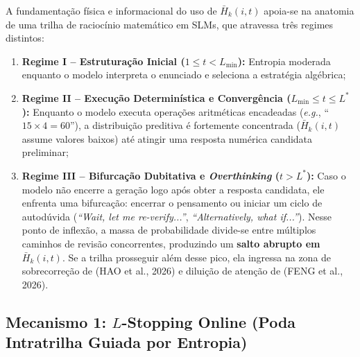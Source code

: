\documentclass[9pt,conference]{IEEEtran}
\begin{document}
A fundamenta\c{c}\~{a}o f\'{i}sica e informacional do uso de $\bar{H}_k(i, t)$ apoia-se na anatomia de uma trilha de racioc\'{i}nio matem\'{a}tico em SLMs, que atravessa tr\^{e}s regimes distintos:
\begin{enumerate}
    \item \textbf{Regime I -- Estrutura\c{c}\~{a}o Inicial ($1 \le t < L_{\min}$):} Entropia moderada enquanto o modelo interpreta o enunciado e seleciona a estrat\'{e}gia alg\'{e}brica;
    \item \textbf{Regime II -- Execu\c{c}\~{a}o Determin\'{i}stica e Converg\^{e}ncia ($L_{\min} \le t \le L^*$):} Enquanto o modelo executa opera\c{c}\~{o}es aritm\'{e}ticas encadeadas (\textit{e.g.}, ``$15 \times 4 = 60$''), a distribui\c{c}\~{a}o preditiva \'{e} fortemente concentrada ($\bar{H}_k(i, t)$ assume valores baixos) at\'{e} atingir uma resposta num\'{e}rica candidata preliminar;
    \item \textbf{Regime III -- Bifurca\c{c}\~{a}o Dubitativa e \textit{Overthinking} ($t > L^*$):} Caso o modelo n\~{a}o encerre a gera\c{c}\~{a}o logo ap\'{o}s obter a resposta candidata, ele enfrenta uma bifurca\c{c}\~{a}o: encerrar o pensamento ou iniciar um ciclo de autod\'{u}vida (\textit{``Wait, let me re-verify...''}, \textit{``Alternatively, what if...''}). Nesse ponto de inflex\~{a}o, a massa de probabilidade divide-se entre m\'{u}ltiplos caminhos de revis\~{a}o concorrentes, produzindo um \textbf{salto abrupto em $\bar{H}_k(i, t)$}. Se a trilha prosseguir al\'{e}m desse pico, ela ingressa na zona de sobrecorre\c{c}\~{a}o de (HAO et al., 2026) e dilui\c{c}\~{a}o de aten\c{c}\~{a}o de (FENG et al., 2026).
\end{enumerate}

\subsection{Mecanismo 1: $L$-Stopping Online (Poda Intratrilha Guiada por Entropia)}
\end{document}
